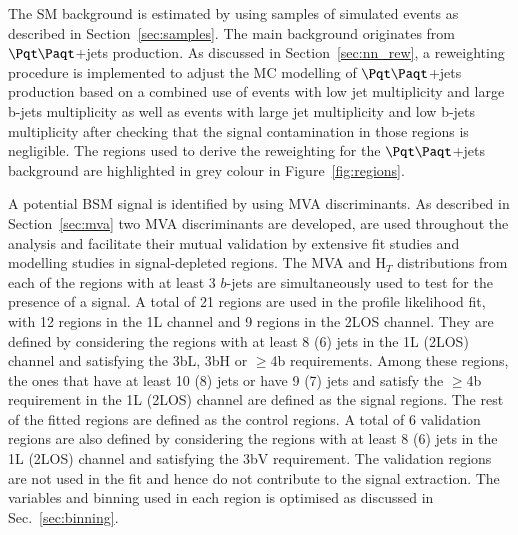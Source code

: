 The SM background is estimated by using samples of simulated events as described in Section~\ref{sec:samples}. 
The main background originates from $\ttbar$+jets production.  As discussed in Section~\ref{sec:nn_rew}, a reweighting procedure is implemented to adjust the MC modelling  of $\ttbar$+jets production based on a  combined use of events with low jet multiplicity and large b-jets multiplicity as well as events with large jet multiplicity and low b-jets multiplicity after checking that the signal contamination in those regions is negligible. The regions used to derive the reweighting for the $\ttbar$+jets background are highlighted in grey colour in Figure~\ref{fig:regions}. 

A potential BSM signal is identified by using MVA discriminants. As described in Section~\ref{sec:mva} two MVA discriminants are developed, are used throughout the analysis and facilitate their mutual validation by extensive fit studies and modelling studies in signal-depleted regions.    
The MVA and H$_T$ distributions from each of the regions with at least 3 $b$-jets are simultaneously used to test for the presence of a signal. 
A total of 21 regions are used in the profile likelihood fit, with 12 regions in the 1L channel and
9 regions in the 2LOS channel.
They are defined by considering the regions with at least 8 (6) jets in the 1L (2LOS) channel and
satisfying the 3bL, 3bH or $\ge$4b requirements.
Among these regions, the ones that have at least 10 (8) jets or have 9 (7) jets and satisfy the $\ge$4b
requirement in the 1L (2LOS) channel are defined as the signal regions.
The rest of the fitted regions are defined as the control regions.
A total of 6 validation regions are also defined by considering the regions with at least 8 (6)
jets in the 1L (2LOS) channel and satisfying the 3bV requirement.
The validation regions are not used in the fit and hence do not contribute to the signal extraction.
The variables and binning used in each region is optimised as discussed in Sec.~\ref{sec:binning}. 
